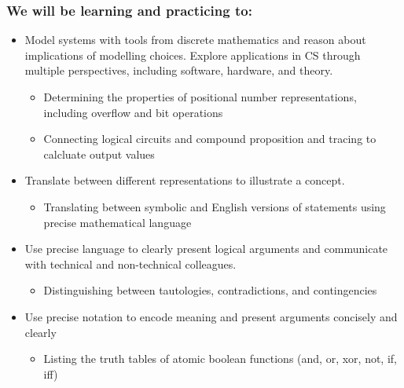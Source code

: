 \subsubsection*{We will be learning and practicing to:}
\begin{itemize}
\item Model systems with tools from discrete mathematics and reason about implications of modelling choices. Explore applications in CS through multiple perspectives, including software, hardware, and theory.
\begin{itemize}
    \item Determining the properties of positional number representations, including overflow and bit operations
   \item Connecting logical circuits and compound proposition and tracing to calcluate output values
\end{itemize}

\item Translate between different representations to illustrate a concept.
\begin{itemize}
   \item Translating between symbolic and English versions of statements using precise mathematical language
\end{itemize}

\item Use precise language to clearly present logical arguments and communicate with technical and non-technical colleagues.
\begin{itemize}
    \item Distinguishing between tautologies, contradictions, and contingencies
\end{itemize}

\item Use precise notation to encode meaning and present arguments concisely and clearly
\begin{itemize}
    \item Listing the truth tables of atomic boolean functions (and, or, xor, not, if, iff)
\end{itemize}


\end{itemize}
